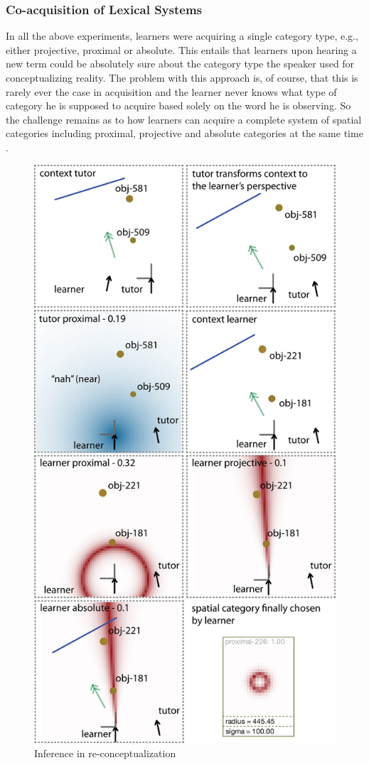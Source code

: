 \subsubsection*{Co-acquisition of Lexical Systems}
In all the above experiments, learners were acquiring a single category type,
e.g., either projective, proximal or absolute. This entails that learners 
upon hearing a new term could be absolutely sure about the 
category type the speaker used for conceptualizing reality.
The problem with this approach is, of course, that this is rarely ever the
case in acquisition and the learner never knows what type of category he is 
supposed to acquire based solely on the word
he is observing. So the challenge remains as to how learners 
can acquire a complete system of spatial categories including proximal, 
projective and absolute categories at the same time . 

\begin{figure}
\begin{center}
\includegraphics[width=0.7\columnwidth]{figs/category-acquisition-absolute+proximal+projective-single-category-acquisition.png}
\end{center}
\caption[Inference in re-conceptualization]{Inference in re-conceptualization}
\label{f:category-acquisition-absolute+proximal+projective-single-acquisition}
\end{figure}

